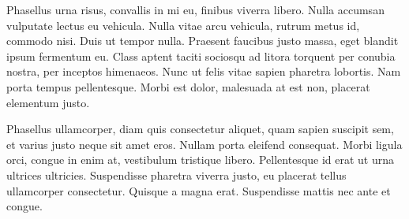 Phasellus urna risus, convallis in mi eu, finibus viverra libero. Nulla accumsan vulputate lectus eu vehicula. Nulla vitae arcu vehicula, rutrum metus id, commodo nisi. Duis ut tempor nulla. Praesent faucibus justo massa, eget blandit ipsum fermentum eu. Class aptent taciti sociosqu ad litora torquent per conubia nostra, per inceptos himenaeos. Nunc ut felis vitae sapien pharetra lobortis. Nam porta tempus pellentesque. Morbi est dolor, malesuada at est non, placerat elementum justo.

Phasellus ullamcorper, diam quis consectetur aliquet, quam sapien suscipit sem, et varius justo neque sit amet eros. Nullam porta eleifend consequat. Morbi ligula orci, congue in enim at, vestibulum tristique libero. Pellentesque id erat ut urna ultrices ultricies. Suspendisse pharetra viverra justo, eu placerat tellus ullamcorper consectetur. Quisque a magna erat. Suspendisse mattis nec ante et congue. 
